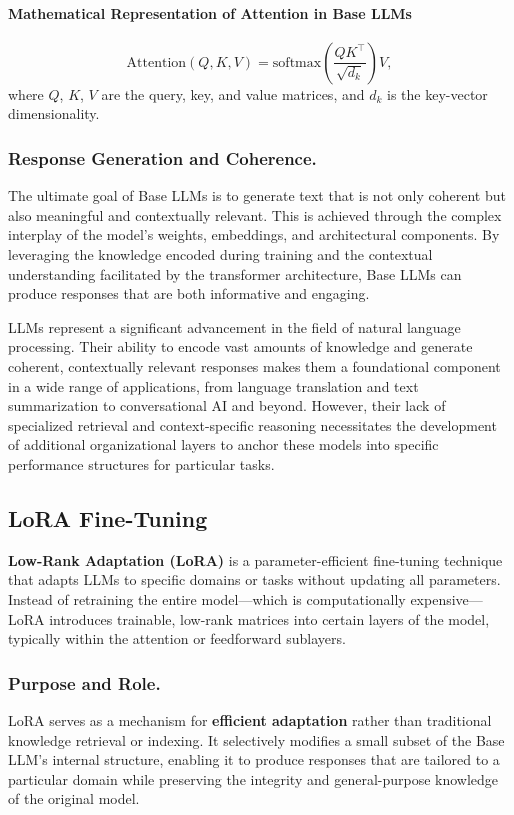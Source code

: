 \documentclass{article}
\begin{document}
\paragraph{Mathematical Representation of Attention in Base LLMs}
\[
\text{Attention}(Q, K, V) = \text{softmax}\!\left(\frac{QK^\top}{\sqrt{d_k}}\right)V,
\]
where $Q$, $K$, $V$ are the query, key, and value matrices, and $d_k$ is the key-vector dimensionality.

\subsubsection{Response Generation and Coherence.} The ultimate goal of Base LLMs is to generate text that is not only coherent but also meaningful and contextually relevant. This is achieved through the complex interplay of the model’s weights, embeddings, and architectural components. By leveraging the knowledge encoded during training and the contextual understanding facilitated by the transformer architecture, Base LLMs can produce responses that are both informative and engaging.

LLMs represent a significant advancement in the field of natural language processing. Their ability to encode vast amounts of knowledge and generate coherent, contextually relevant responses makes them a foundational component in a wide range of applications, from language translation and text summarization to conversational AI and beyond. However, their lack of specialized retrieval and context-specific reasoning necessitates the development of additional organizational layers to anchor these models into specific performance structures for particular tasks.

\hrulefill{} 

\subsection{LoRA Fine-Tuning}
\textbf{Low-Rank Adaptation (LoRA)} is a parameter-efficient fine-tuning technique that adapts LLMs to specific domains or tasks without updating all parameters. Instead of retraining the entire model—which is computationally expensive—LoRA introduces trainable, low-rank matrices into certain layers of the model, typically within the attention or feedforward sublayers. 

\subsubsection{Purpose and Role.} LoRA serves as a mechanism for \textbf{efficient adaptation} rather than traditional knowledge retrieval or indexing. It selectively modifies a small subset of the Base LLM’s internal structure, enabling it to produce responses that are tailored to a particular domain while preserving the integrity and general-purpose knowledge of the original model.
\end{document}

